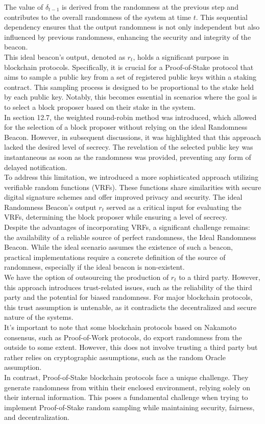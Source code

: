 The value of $\delta_{t-1}$ is derived from the randomness at the previous step and contributes to the overall randomness of the system at time $t$. This sequential dependency ensures that the output randomness is not only independent but also influenced by previous randomness, enhancing the security and integrity of the beacon.\\
This ideal beacon's output, denoted as $r_t$, holds a significant purpose in blockchain protocols. Specifically, it is crucial for a Proof-of-Stake protocol that aims to sample a public key from a set of registered public keys within a staking contract. This sampling process is designed to be proportional to the stake held by each public key. Notably, this becomes essential in scenarios where the goal is to select a block proposer based on their stake in the system.\\
In section 12.7, the weighted round-robin method was introduced, which allowed for the selection of a block proposer without relying on the ideal Randomness Beacon. However, in subsequent discussions, it was highlighted that this approach lacked the desired level of secrecy. The revelation of the selected public key was instantaneous as soon as the randomness was provided, preventing any form of delayed notification.\\
To address this limitation, we introduced a more sophisticated approach utilizing verifiable random functions (VRFs). These functions share similarities with secure digital signature schemes and offer improved privacy and security. The ideal Randomness Beacon's output $r_t$ served as a critical input for evaluating the VRFs, determining the block proposer while ensuring a level of secrecy. \\
Despite the advantages of incorporating VRFs, a significant challenge remains: the availability of a reliable source of perfect randomness, the Ideal Randomness Beacon. While the ideal scenario assumes the existence of such a beacon, practical implementations require a concrete definition of the source of randomness, especially if the ideal beacon is non-existent.\\
We have the option of outsourcing the production of $r_t$ to a third party. However, this approach introduces trust-related issues, such as the reliability of the third party and the potential for biased randomness. For major blockchain protocols, this trust assumption is untenable, as it contradicts the decentralized and secure nature of the systems.\\
It's important to note that some blockchain protocols based on Nakamoto consensus, such as Proof-of-Work protocols, do export randomness from the outside to some extent. However, this does not involve trusting a third party but rather relies on cryptographic assumptions, such as the random Oracle assumption.\\
In contrast, Proof-of-Stake blockchain protocols face a unique challenge. They generate randomness from within their enclosed environment, relying solely on their internal information. This poses a fundamental challenge when trying to implement Proof-of-Stake random sampling while maintaining security, fairness, and decentralization.

